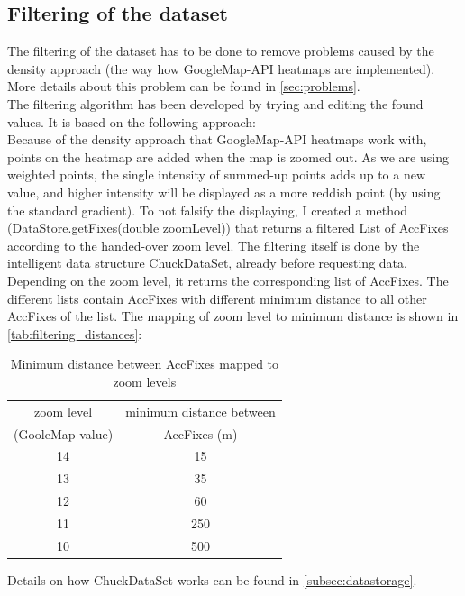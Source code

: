 \documentclass[10pt,a4paper]{article} %
\begin{document}
	\subsection{Filtering of the dataset}\label{subsec:filtering}

	The filtering of the dataset has to be done to remove problems caused by the density approach (the way how GoogleMap-API heatmaps are implemented).
	More details about this problem can be found in \autoref{sec:problems}.\\
	The filtering algorithm has been developed by trying and editing the found values.
	It is based on the following approach:\\
	Because of the density approach that GoogleMap-API heatmaps work with, points on the heatmap are added when the map is zoomed out.
	As we are using weighted points, the single intensity of summed-up points adds up to a new value, and higher intensity will be displayed as a more reddish point (by using the standard gradient).
	To not falsify the displaying, I created a method (DataStore.getFixes(double zoomLevel)) that returns a filtered List of AccFixes according to the handed-over zoom level.
	The filtering itself is done by the intelligent data structure ChuckDataSet, already before requesting data.
	Depending on the zoom level, it returns the corresponding list of AccFixes.
	The different lists contain AccFixes with different minimum distance to all other AccFixes of the list.
	The mapping of zoom level to minimum distance is shown in \autoref{tab:filtering_distances}:

	\begin{table}[H]
	  \centering
 
  
	  \begin{tabular}{c|c}
	    zoom level & minimum distance between\\
		(GooleMap value) 	& AccFixes (m)\\
	    \hline
	    	14 & 15\\
		13 & 35\\
		12 & 60\\
		11 & 250\\
		10 & 500\\
	  \end{tabular}
	   \caption{Minimum distance between AccFixes mapped to zoom levels} 
	   \label{tab:filtering_distances}
	\end{table}

	Details on how ChuckDataSet works can be found in \autoref{subsec:datastorage}.
\end{document}
